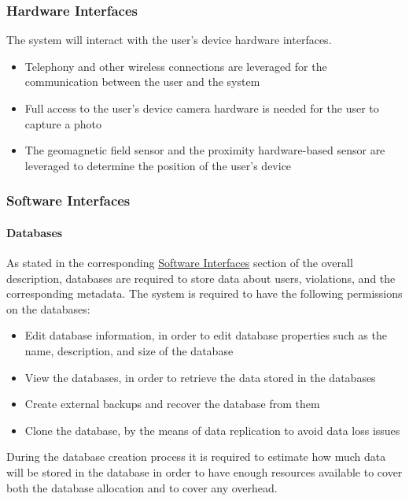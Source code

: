 \clearpage

\subsubsection{Hardware Interfaces}
\label{sec:hardwareinterfaces2}
The system will interact with the user's device hardware interfaces.	
	\begin{itemize} 
		\item Telephony and other wireless connections are leveraged for the communication between the user and the system
		\item Full access to the user's device camera hardware is needed for the user to capture a photo
		\item The geomagnetic field sensor and the proximity hardware-based sensor are leveraged to determine the position of the user's device
	\end{itemize}
	
\subsubsection{Software Interfaces}

\paragraph{Databases} As stated in the corresponding \hyperref[sec:softwareinterfaces]{Software Interfaces} section of the overall description, databases are required to store data about users, violations, and the corresponding metadata. The system is required to have the following permissions on the databases:

	\begin{itemize}
		\item Edit database information, in order to edit database properties such as the name, description, and size of the database
		\item View the databases, in order to retrieve the data stored in the databases
		\item Create external backups and recover the database from them
		\item Clone the database, by the means of data replication to avoid data loss issues 
	\end{itemize}
During the database creation process it is required to estimate how much data will be stored in the database in order to have enough resources available to cover both the database allocation and to cover any overhead.
	

